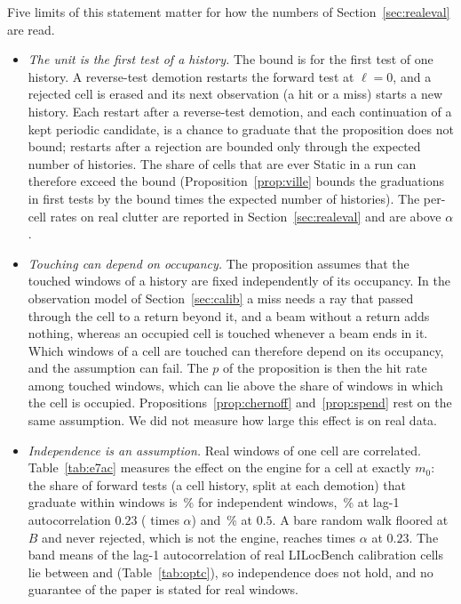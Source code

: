 Five limits of this statement matter for how the numbers of Section~\ref{sec:realeval} are read.
\begin{itemize}
  \item \emph{The unit is the first test of a history.} The bound is for the first test of one history. A reverse-test demotion restarts the forward test at $\ell=0$, and a rejected cell is erased and its next observation (a hit or a miss) starts a new history. Each restart after a reverse-test demotion, and each continuation of a kept periodic candidate, is a chance to graduate that the proposition does not bound; restarts after a rejection are bounded only through the expected number of histories. The share of cells that are ever Static in a run can therefore exceed the bound (Proposition~\ref{prop:ville} bounds the graduations in first tests by the bound times the expected number of histories). The per-cell rates on real clutter are reported in Section~\ref{sec:realeval} and are above $\alpha$.
  \item \emph{Touching can depend on occupancy.} The proposition assumes that the touched windows of a history are fixed independently of its occupancy. In the observation model of Section~\ref{sec:calib} a miss needs a ray that passed through the cell to a return beyond it, and a beam without a return adds nothing, whereas an occupied cell is touched whenever a beam ends in it. Which windows of a cell are touched can therefore depend on its occupancy, and the assumption can fail. The $p$ of the proposition is then the hit rate among touched windows, which can lie above the share of windows in which the cell is occupied. Propositions~\ref{prop:chernoff} and~\ref{prop:spend} rest on the same assumption. We did not measure how large this effect is on real data.
  \item \emph{Independence is an assumption.} Real windows of one cell are correlated. Table~\ref{tab:e7ac} measures the effect on the engine for a cell at exactly $m_0$: the share of forward tests (a cell history, split at each demotion) that graduate within \SqAcHorizon{} windows is \SqAcShareZero\,\% for independent windows, \SqAcShareTw\,\% at lag-1 autocorrelation $0.23$ (\SqAcTw{} times $\alpha$) and \SqAcShareHalf\,\% at $0.5$. A bare random walk floored at $B$ and never rejected, which is not the engine, reaches \SqRefWalk{} times $\alpha$ at $0.23$. The band means of the lag-1 autocorrelation of real LILocBench calibration cells lie between \CalLagLo{} and \CalLagHi{} (Table~\ref{tab:optc}), so independence does not hold, and no guarantee of the paper is stated for real windows.

\end{itemize}
